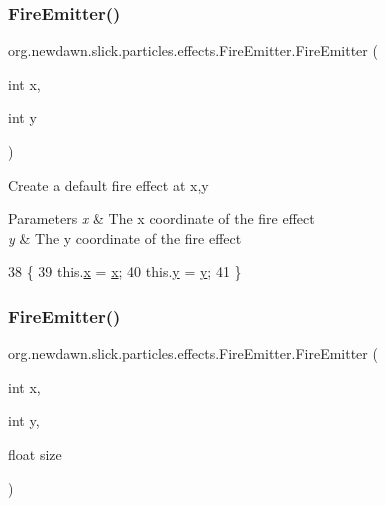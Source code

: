 \subsubsection{\texorpdfstring{Fire\+Emitter()}{FireEmitter()}\hspace{0.1cm}{\footnotesize\ttfamily [2/3]}}
{\footnotesize\ttfamily org.\+newdawn.\+slick.\+particles.\+effects.\+Fire\+Emitter.\+Fire\+Emitter (\begin{DoxyParamCaption}\item[{int}]{x,  }\item[{int}]{y }\end{DoxyParamCaption})\hspace{0.3cm}{\ttfamily [inline]}}

Create a default fire effect at x,y


\begin{DoxyParams}{Parameters}
{\em x} & The x coordinate of the fire effect \\
\hline
{\em y} & The y coordinate of the fire effect \\
\hline
\end{DoxyParams}

\begin{DoxyCode}
38                                      \{
39         this.\mbox{\hyperlink{classorg_1_1newdawn_1_1slick_1_1particles_1_1effects_1_1_fire_emitter_a0a4e74935fd83b2cc185add63d715c50}{x}} = \mbox{\hyperlink{classorg_1_1newdawn_1_1slick_1_1particles_1_1effects_1_1_fire_emitter_a0a4e74935fd83b2cc185add63d715c50}{x}};
40         this.\mbox{\hyperlink{classorg_1_1newdawn_1_1slick_1_1particles_1_1effects_1_1_fire_emitter_afa9422fae980440d2ff94c2e115dde3c}{y}} = \mbox{\hyperlink{classorg_1_1newdawn_1_1slick_1_1particles_1_1effects_1_1_fire_emitter_afa9422fae980440d2ff94c2e115dde3c}{y}};
41     \}
\end{DoxyCode}
\mbox{\label{classorg_1_1newdawn_1_1slick_1_1particles_1_1effects_1_1_fire_emitter_a93ae7b99bcc171b7acd8342cfe9409ad}} 
\subsubsection{\texorpdfstring{Fire\+Emitter()}{FireEmitter()}\hspace{0.1cm}{\footnotesize\ttfamily [3/3]}}
{\footnotesize\ttfamily org.\+newdawn.\+slick.\+particles.\+effects.\+Fire\+Emitter.\+Fire\+Emitter (\begin{DoxyParamCaption}\item[{int}]{x,  }\item[{int}]{y,  }\item[{float}]{size }\end{DoxyParamCaption})\hspace{0.3cm}{\ttfamily [inline]}}

